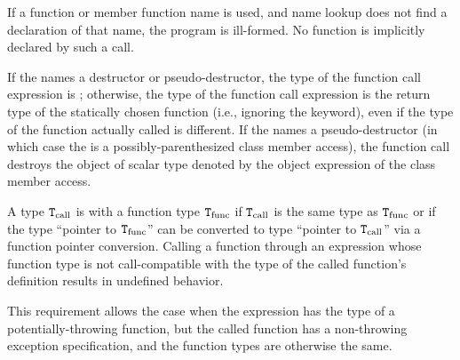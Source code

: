 \pnum
\begin{note}
If a function or member function name is used, and name
lookup does not find a declaration of that name,
the program is ill-formed. No function is implicitly declared by such a
call.
\end{note}

\pnum
If the  names
a destructor or pseudo-destructor,
the type of the function call expression is ; otherwise, the
type of the function call expression is the return type of the
statically chosen function (i.e., ignoring the  keyword),
even if the type of the function actually called is different.
%
If the  names a pseudo-destructor
(in which case the 
is a possibly-parenthesized class member access),
the function call destroys
the object of scalar type
denoted by the object expression
of the class member access.

\pnum
A type $\texttt{\protect T}_\text{call}$ is
 with a function type $\texttt{\protect T}_\text{func}$
if $\texttt{\protect T}_\text{call}$ is the same type as $\texttt{\protect T}_\text{func}$ or
if the type ``pointer to $\texttt{\protect T}_\text{func}$'' can be
converted to type ``pointer to $\texttt{\protect T}_\text{call}$''
via a function pointer conversion.
Calling a function through an
expression whose function type
is not call-compatible with the
type of the called function's
definition results in undefined behavior.
\begin{note}
This requirement allows the case
when the expression has the type of a
potentially-throwing function, but the called function has
a non-throwing exception specification,
and the function types are otherwise the same.
\end{note}

